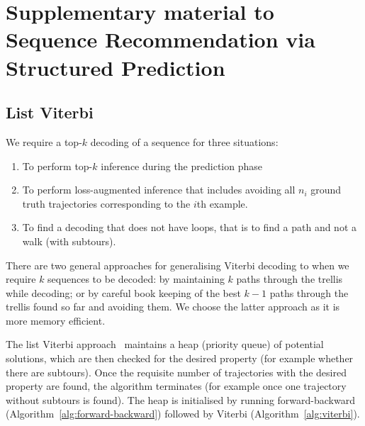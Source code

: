 \appendix
\section{Supplementary material to Sequence Recommendation via Structured Prediction}
\label{sec:supplement}

\subsection{List Viterbi}
\label{sec:listviterbi-supp}

We require a top-$k$ decoding of a sequence for three situations:
\begin{enumerate}
  \item To perform top-$k$ inference during the prediction phase
  \item To perform loss-augmented inference that includes avoiding all $n_i$ ground truth
    trajectories corresponding to the $i$th example.
  \item To find a decoding that does not have loops, that is to find a path
    and not a walk (with subtours).
\end{enumerate}

There are two general approaches for generalising Viterbi decoding to when we require $k$
sequences to be decoded: by maintaining $k$ paths through the trellis while decoding; or by
careful book keeping of the best $k-1$ paths through the trellis found so far and avoiding them.
We choose the latter approach as it is more memory efficient.

The list Viterbi approach~\cite{nilsson2001sequentially,seshadri1994list} maintains
a heap (\ie priority queue) of potential solutions, which are then checked for the desired property (for example
whether there are subtours). Once the requisite number of trajectories with the desired
property are found, the algorithm terminates (for example once one trajectory without subtours
is found). The heap is initialised by running forward-backward
(Algorithm~\ref{alg:forward-backward})
followed by Viterbi (Algorithm~\ref{alg:viterbi}).


